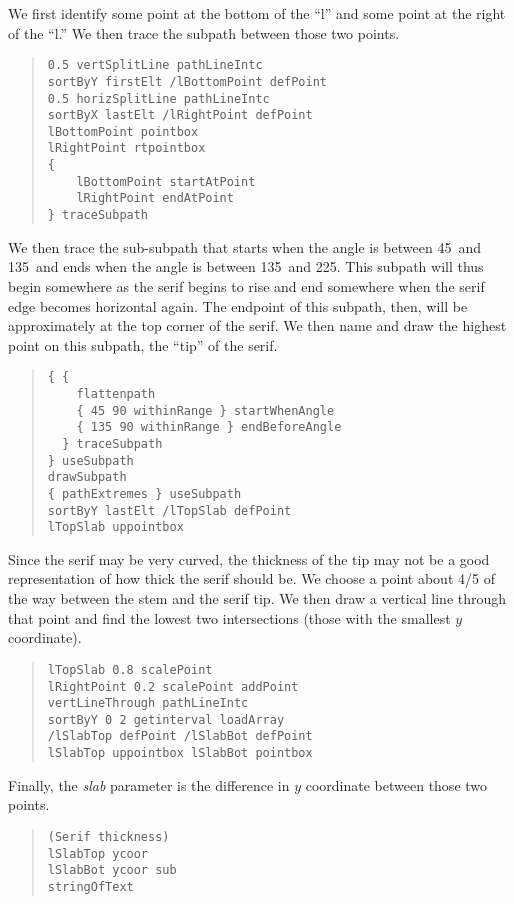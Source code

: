 \documentclass[12pt]{article}
\begin{document}
We first identify some point at the bottom of the ``l'' and some point at the
right of the ``l.'' We then trace the subpath between those two points.
\begin{quote}
\begin{verbatim}
0.5 vertSplitLine pathLineIntc
sortByY firstElt /lBottomPoint defPoint
0.5 horizSplitLine pathLineIntc
sortByX lastElt /lRightPoint defPoint
lBottomPoint pointbox
lRightPoint rtpointbox
{
    lBottomPoint startAtPoint
    lRightPoint endAtPoint
} traceSubpath
\end{verbatim}
\end{quote}
We then trace the sub-subpath that starts when the angle is between
45\textdegree\ and 135\textdegree\ and ends when the angle is between
135\textdegree\ and 225\textdegree. This subpath will thus begin somewhere as
the serif begins to rise and end somewhere when the serif edge becomes
horizontal again. The endpoint of this subpath, then, will be approximately at
the top corner of the serif. We then name and draw the highest point on this
subpath, the ``tip'' of the serif.
\begin{quote}
\begin{verbatim}
{ {
    flattenpath
    { 45 90 withinRange } startWhenAngle
    { 135 90 withinRange } endBeforeAngle
  } traceSubpath
} useSubpath
drawSubpath
{ pathExtremes } useSubpath
sortByY lastElt /lTopSlab defPoint
lTopSlab uppointbox
\end{verbatim}
\end{quote}
Since the serif may be very curved, the thickness of the tip may not be a good
representation of how thick the serif should be. We choose a point about 4/5 of
the way between the stem and the serif tip. We then draw a vertical line through
that point and find the lowest two intersections (those with the smallest $y$
coordinate).
\begin{quote}
\begin{verbatim}
lTopSlab 0.8 scalePoint
lRightPoint 0.2 scalePoint addPoint
vertLineThrough pathLineIntc
sortByY 0 2 getinterval loadArray
/lSlabTop defPoint /lSlabBot defPoint
lSlabTop uppointbox lSlabBot pointbox
\end{verbatim}
\end{quote}
Finally, the \emph{slab} parameter is the difference in $y$ coordinate between
those two points.
\begin{quote}
\begin{verbatim}
(Serif thickness)
lSlabTop ycoor
lSlabBot ycoor sub
stringOfText
\end{verbatim}
\end{quote}
\end{document}
